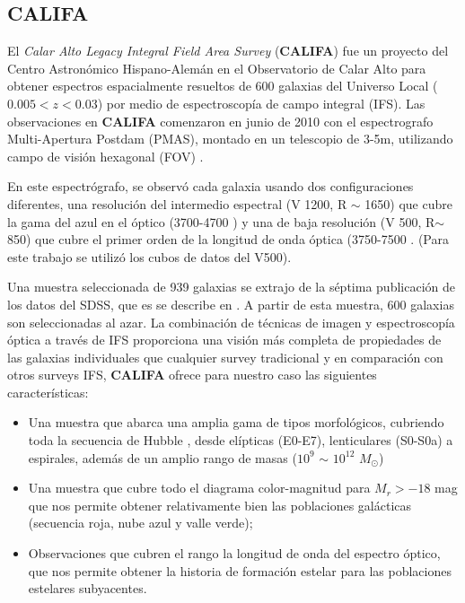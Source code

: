 \subsection{CALIFA}

El \textit{Calar Alto Legacy Integral Field Area Survey} (\textbf{CALIFA}) \citep{sanchez2012}
fue un  proyecto  del Centro Astronómico Hispano-Alemán en el Observatorio de Calar Alto para
obtener espectros espacialmente resueltos de 600 galaxias del Universo Local ($0.005 <z <0.03$)
por medio de espectroscopía de campo integral (IFS). Las observaciones en \textbf{CALIFA}
comenzaron en junio de 2010 con el espectrografo Multi-Apertura Postdam (PMAS), montado en un telescopio de 3-5m,
utilizando  campo de visión hexagonal (FOV) \citep{Verheijen2004}.

\bigskip

\noindent En este espectrógrafo, se observó cada galaxia usando dos configuraciones diferentes,
una resolución del intermedio espectral (V 1200, R $\sim$ 1650) que cubre la gama del azul en el óptico (3700-4700 \text{\AA})
y una de baja resolución  (V 500, R$\sim$ 850) que cubre el primer orden de la longitud de onda óptica (3750-7500 \text{\AA}.
(Para este trabajo se utilizó los cubos de datos del V500).

\bigskip


\noindent Una muestra seleccionada  de 939 galaxias se extrajo de la séptima publicación de los datos del SDSS,
que es se describe en \citep{walcher2014}. A partir de esta muestra, 600 galaxias son seleccionadas al azar.
La combinación de técnicas de imagen y espectroscopía óptica a través de IFS proporciona una visión más completa de propiedades
de las galaxias individuales que cualquier survey tradicional y en comparación con otros surveys IFS, \textbf{CALIFA} ofrece para nuestro caso las siguientes características:


\begin{itemize}

\item Una muestra que abarca una amplia gama de tipos morfológicos, cubriendo toda la secuencia de Hubble , desde elípticas (E0-E7), lenticulares (S0-S0a) a espirales, además de un amplio rango de masas ($10^9$ $\sim$ $10^{12}$ $M_{\odot}$)

\item Una muestra que cubre todo el  diagrama color-magnitud para $M_r > - 18$ mag que nos permite obtener relativamente bien las poblaciones galácticas (secuencia roja, nube azul y valle verde);

\item Observaciones que cubren el rango la longitud de onda  del espectro óptico, que nos permite obtener la historia de formación estelar para las poblaciones estelares subyacentes.

\end{itemize}

